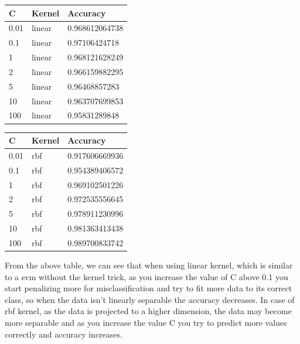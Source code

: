 \documentclass{article}
\begin{document}
\begin{enumerate}
\begin{table}[h!]
    \begin{minipage}{.5\textwidth}
    \centering
	\begin{tabular}{|l|l|l|}
	\hline
	C & Kernel & Accuracy\\
	\hline
	0.01 & linear & 0.968612064738 \\
	0.1  & linear & 0.97106424718  \\
	1    & linear & 0.968121628249 \\
	2    & linear & 0.966159882295 \\
	5    & linear & 0.96468857283  \\
	10   & linear & 0.963707699853 \\
	100  & linear & 0.95831289848 \\
	\hline
	\end{tabular}
	\end{minipage}
    \begin{minipage}{.5\textwidth}
    \centering
	\begin{tabular}{|l|l|l|}
	\hline
	C & Kernel & Accuracy\\
	\hline
	0.01 & rbf & 0.917606669936 \\
	0.1  & rbf & 0.954389406572 \\
	1    & rbf & 0.969102501226 \\
	2    & rbf & 0.972535556645 \\
	5    & rbf & 0.978911230996 \\
	10   & rbf & 0.981363413438 \\
	100  & rbf & 0.989700833742 \\
	\hline
	\end{tabular}
	\end{minipage}
\end{table}

From the above table, we can see that when using linear kernel, which is similar to a  svm without the kernel trick, as you increase the value of C above 0.1 you start penalizing more for misclassification and try to fit more data to its correct class, so when the data isn't linearly separable the accuracy decreases. In case of rbf kernel, as the data is projected to a higher dimension, the data may become more separable and as you increase the value C you try to predict more values correctly and accuracy increases.


\end{enumerate}
\end{document}
